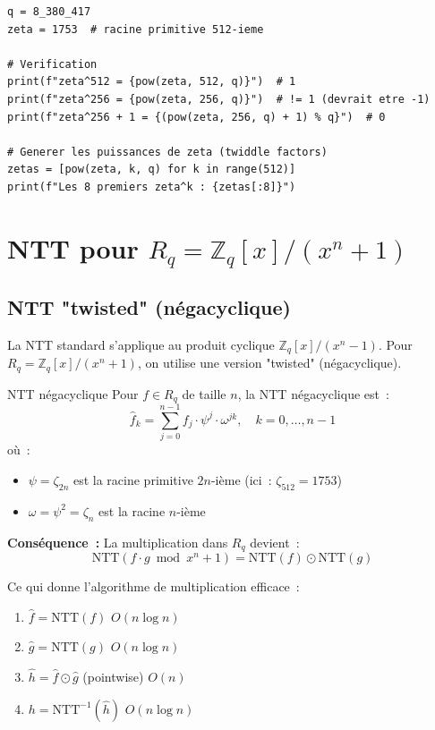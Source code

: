 \documentclass[12pt, a4paper]{article}
\newcommand{\Zq}{\mathbb{Z}_q}
\newcommand{\Rq}{R_q}
\newcommand{\NTT}{\mathrm{NTT}}
\newcommand{\INTT}{\mathrm{NTT}^{-1}}
\begin{document}
\begin{lstlisting}[style=python]
q = 8_380_417
zeta = 1753  # racine primitive 512-ieme

# Verification
print(f"zeta^512 = {pow(zeta, 512, q)}")  # 1
print(f"zeta^256 = {pow(zeta, 256, q)}")  # != 1 (devrait etre -1)
print(f"zeta^256 + 1 = {(pow(zeta, 256, q) + 1) % q}")  # 0

# Generer les puissances de zeta (twiddle factors)
zetas = [pow(zeta, k, q) for k in range(512)]
print(f"Les 8 premiers zeta^k : {zetas[:8]}")
\end{lstlisting}

\section{NTT pour $R_q = \Zq[x]/(x^n+1)$}

\subsection{NTT "twisted" (négacyclique)}

La NTT standard s'applique au produit cyclique $\Zq[x]/(x^n-1)$.
Pour $\Rq = \Zq[x]/(x^n+1)$, on utilise une version "twisted" (négacyclique).

\begin{theorembox}{NTT négacyclique}
Pour $f \in \Rq$ de taille $n$, la NTT négacyclique est~:
$$\hat{f}_k = \sum_{j=0}^{n-1} f_j \cdot \psi^j \cdot \omega^{jk}, \quad k = 0, \ldots, n-1$$
où~:
\begin{itemize}
  \item $\psi = \zeta_{2n}$ est la racine primitive $2n$-ième (ici~: $\zeta_{512} = 1753$)
  \item $\omega = \psi^2 = \zeta_n$ est la racine $n$-ième
\end{itemize}
\end{theorembox}

\textbf{Conséquence~:} La multiplication dans $\Rq$ devient~:
$$\text{NTT}(f \cdot g \bmod x^n+1) = \text{NTT}(f) \odot \text{NTT}(g)$$

Ce qui donne l'algorithme de multiplication efficace~:
\begin{enumerate}
  \item $\hat{f} = \NTT(f)$ \hfill$O(n \log n)$
  \item $\hat{g} = \NTT(g)$ \hfill$O(n \log n)$
  \item $\hat{h} = \hat{f} \odot \hat{g}$ (pointwise) \hfill$O(n)$
  \item $h = \INTT(\hat{h})$ \hfill$O(n \log n)$
\end{enumerate}
\end{document}
